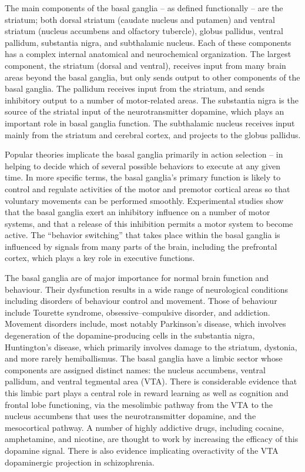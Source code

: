The main components of the basal ganglia -- as defined functionally -- are the striatum; both dorsal striatum (caudate nucleus and putamen) and ventral striatum (nucleus accumbens and olfactory tubercle), globus pallidus, ventral pallidum, substantia nigra, and subthalamic nucleus. Each of these components has a complex internal anatomical and neurochemical organization. The largest component, the striatum (dorsal and ventral), receives input from many brain areas beyond the basal ganglia, but only sends output to other components of the basal ganglia. The pallidum receives input from the striatum, and sends inhibitory output to a number of motor-related areas. The substantia nigra is the source of the striatal input of the neurotransmitter dopamine, which plays an important role in basal ganglia function. The subthalamic nucleus receives input mainly from the striatum and cerebral cortex, and projects to the globus pallidus.

Popular theories implicate the basal ganglia primarily in action selection -- in helping to decide which of several possible behaviors to execute at any given time. In more specific terms, the basal ganglia's primary function is likely to control and regulate activities of the motor and premotor cortical areas so that voluntary movements can be performed smoothly. Experimental studies show that the basal ganglia exert an inhibitory influence on a number of motor systems, and that a release of this inhibition permits a motor system to become active. The ``behavior switching'' that takes place within the basal ganglia is influenced by signals from many parts of the brain, including the prefrontal cortex, which plays a key role in executive functions.

The basal ganglia are of major importance for normal brain function and behaviour. Their dysfunction results in a wide range of neurological conditions including disorders of behaviour control and movement. Those of behaviour include Tourette syndrome, obsessive--compulsive disorder, and addiction. Movement disorders include, most notably Parkinson's disease, which involves degeneration of the dopamine-producing cells in the substantia nigra, Huntington's disease, which primarily involves damage to the striatum, dystonia, and more rarely hemiballismus. The basal ganglia have a limbic sector whose components are assigned distinct names: the nucleus accumbens, ventral pallidum, and ventral tegmental area (VTA). There is considerable evidence that this limbic part plays a central role in reward learning as well as cognition and frontal lobe functioning, via the mesolimbic pathway from the VTA to the nucleus accumbens that uses the neurotransmitter dopamine, and the mesocortical pathway. A number of highly addictive drugs, including cocaine, amphetamine, and nicotine, are thought to work by increasing the efficacy of this dopamine signal. There is also evidence implicating overactivity of the VTA dopaminergic projection in schizophrenia.

